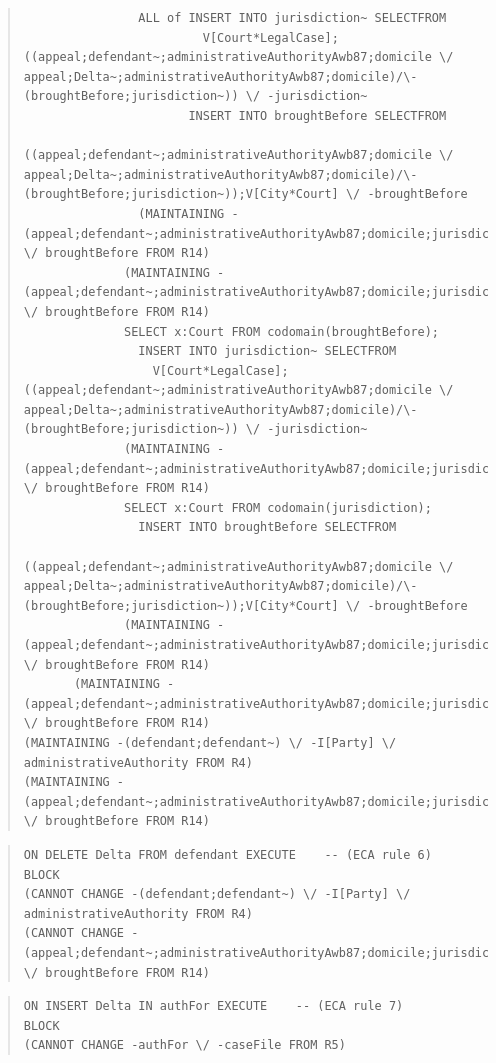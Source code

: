 \documentclass[10pt,a4paper]{report}              %
\theoremstyle{plain}\theorembodyfont{\rmfamily}\newtheorem{definition}{Definition}[section]
\theoremstyle{plain}\theorembodyfont{\rmfamily}\newtheorem{designrule}[definition]{Requirement}
\begin{document}
\begin{quote}
\begin{verbatim}
                ALL of INSERT INTO jurisdiction~ SELECTFROM
                         V[Court*LegalCase];((appeal;defendant~;administrativeAuthorityAwb87;domicile \/ appeal;Delta~;administrativeAuthorityAwb87;domicile)/\-(broughtBefore;jurisdiction~)) \/ -jurisdiction~
                       INSERT INTO broughtBefore SELECTFROM
                         ((appeal;defendant~;administrativeAuthorityAwb87;domicile \/ appeal;Delta~;administrativeAuthorityAwb87;domicile)/\-(broughtBefore;jurisdiction~));V[City*Court] \/ -broughtBefore
                (MAINTAINING -(appeal;defendant~;administrativeAuthorityAwb87;domicile;jurisdiction) \/ broughtBefore FROM R14)
              (MAINTAINING -(appeal;defendant~;administrativeAuthorityAwb87;domicile;jurisdiction) \/ broughtBefore FROM R14)
              SELECT x:Court FROM codomain(broughtBefore);
                INSERT INTO jurisdiction~ SELECTFROM
                  V[Court*LegalCase];((appeal;defendant~;administrativeAuthorityAwb87;domicile \/ appeal;Delta~;administrativeAuthorityAwb87;domicile)/\-(broughtBefore;jurisdiction~)) \/ -jurisdiction~
              (MAINTAINING -(appeal;defendant~;administrativeAuthorityAwb87;domicile;jurisdiction) \/ broughtBefore FROM R14)
              SELECT x:Court FROM codomain(jurisdiction);
                INSERT INTO broughtBefore SELECTFROM
                  ((appeal;defendant~;administrativeAuthorityAwb87;domicile \/ appeal;Delta~;administrativeAuthorityAwb87;domicile)/\-(broughtBefore;jurisdiction~));V[City*Court] \/ -broughtBefore
              (MAINTAINING -(appeal;defendant~;administrativeAuthorityAwb87;domicile;jurisdiction) \/ broughtBefore FROM R14)
       (MAINTAINING -(appeal;defendant~;administrativeAuthorityAwb87;domicile;jurisdiction) \/ broughtBefore FROM R14)
(MAINTAINING -(defendant;defendant~) \/ -I[Party] \/ administrativeAuthority FROM R4)
(MAINTAINING -(appeal;defendant~;administrativeAuthorityAwb87;domicile;jurisdiction) \/ broughtBefore FROM R14)
\end{verbatim}
\end{quote}
\begin{quote}
\begin{verbatim}
ON DELETE Delta FROM defendant EXECUTE    -- (ECA rule 6)
BLOCK
(CANNOT CHANGE -(defendant;defendant~) \/ -I[Party] \/ administrativeAuthority FROM R4)
(CANNOT CHANGE -(appeal;defendant~;administrativeAuthorityAwb87;domicile;jurisdiction) \/ broughtBefore FROM R14)
\end{verbatim}
\end{quote}
\begin{quote}
\begin{verbatim}
ON INSERT Delta IN authFor EXECUTE    -- (ECA rule 7)
BLOCK
(CANNOT CHANGE -authFor \/ -caseFile FROM R5)
\end{verbatim}
\end{quote}
\end{document}
